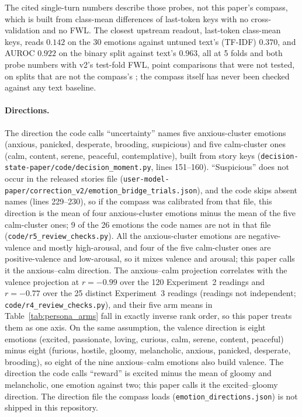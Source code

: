 \documentclass[11pt,a4paper]{article}
\begin{document}
The cited single-turn numbers describe those probes, not this paper's
compass, which is built from class-mean differences of last-token keys
with no cross-validation and no FWL. The closest upstream readout,
last-token class-mean keys, reads $0.142$ on the 30 emotions against
untuned text's (TF-IDF) $0.370$, and AUROC $0.922$ on the binary split
against text's $0.963$, all at 5 folds and both probe numbers with v2's
test-fold FWL, point comparisons that were not tested, on splits that
are not the compass's \citep{lyra2026usermodel}; the compass itself has
never been checked against any text baseline.

\paragraph{Directions.} The direction the code calls ``uncertainty''
names five anxious-cluster emotions (anxious, panicked, desperate,
brooding, suspicious) and five calm-cluster ones (calm, content, serene,
peaceful, contemplative), built from story keys
(\texttt{decision-state-paper/\allowbreak code/\allowbreak decision\_moment.py}, lines
151--160). ``Suspicious'' does not occur in the released stories file
(\texttt{user-model-paper/\allowbreak correction\_v2/\allowbreak emotion\_bridge\_trials.json}),
and the code skips absent names (lines 229--230), so if the compass was
calibrated from that file, this direction is the mean of four
anxious-cluster emotions minus the mean of the five calm-cluster ones;
9 of the 26 emotions the code names are not in that file
(\texttt{code/r5\_review\_checks.py}). All the anxious-cluster emotions
are negative-valence and mostly high-arousal, and four of the five
calm-cluster ones are positive-valence and low-arousal, so it mixes
valence and arousal; this paper calls it the anxious--calm direction.
The anxious--calm projection correlates with the valence projection at
$r{=}-0.99$ over the 120 Experiment~2 readings and $r{=}-0.77$ over the
25 distinct Experiment~3 readings (readings not independent;
\texttt{code/r4\_review\_checks.py}), and their five arm means in
Table~\ref{tab:persona_arms} fall in exactly inverse rank order, so this
paper treats them as one axis. On the same assumption, the valence
direction is eight emotions (excited, passionate, loving, curious, calm,
serene, content, peaceful) minus eight (furious, hostile, gloomy,
melancholic, anxious, panicked, desperate, brooding), so eight of the
nine anxious--calm emotions also build valence. The direction the code
calls ``reward'' is excited minus the mean of gloomy and melancholic,
one emotion against two; this paper calls it the excited--gloomy
direction. The direction file the compass loads
(\texttt{emotion\_directions.json}) is not shipped in this repository.
\end{document}
